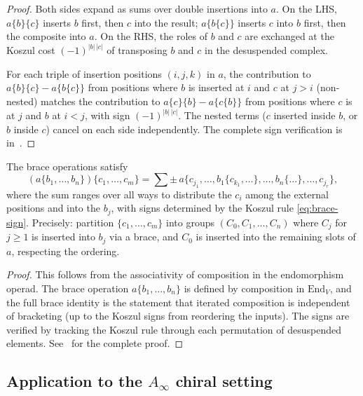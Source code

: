 \begin{proof}
Both sides expand as sums over double insertions into $a$. On the LHS, $a\{b\}\{c\}$ inserts $b$ first, then $c$ into the result; $a\{b\{c\}\}$ inserts $c$ into $b$ first, then the composite into $a$. On the RHS, the roles of $b$ and $c$ are exchanged at the Koszul cost $(-1)^{|b|\,|c|}$ of transposing $b$ and $c$ in the desuspended complex.

For each triple of insertion positions $(i, j, k)$ in $a$, the contribution to $a\{b\}\{c\} - a\{b\{c\}\}$ from positions where $b$ is inserted at $i$ and $c$ at $j > i$ (non-nested) matches the contribution to $a\{c\}\{b\} - a\{c\{b\}\}$ from positions where $c$ is at $j$ and $b$ at $i < j$, with sign $(-1)^{|b|\,|c|}$. The nested terms ($c$ inserted inside $b$, or $b$ inside $c$) cancel on each side independently. The complete sign verification is in~\cite{GJ94}.
\end{proof}

\begin{proposition}
\label{prop:full-brace}
The brace operations satisfy
\[
(a\{b_1, \ldots, b_n\})\{c_1, \ldots, c_m\} = \sum \pm\, a\{c_{j_1}, \ldots, b_1\{c_{k_1}, \ldots\}, \ldots, b_n\{\ldots\}, \ldots, c_{j_r}\},
\]
where the sum ranges over all ways to distribute the $c_i$ among the external positions and into the $b_j$, with signs determined by the Koszul rule \eqref{eq:brace-sign}. Precisely: partition $\{c_1, \ldots, c_m\}$ into groups $(C_0, C_1, \ldots, C_n)$ where $C_j$ for $j \ge 1$ is inserted into $b_j$ via a brace, and $C_0$ is inserted into the remaining slots of $a$, respecting the ordering.
\end{proposition}

\begin{proof}
This follows from the associativity of composition in the endomorphism operad. The brace operation $a\{b_1, \ldots, b_n\}$ is defined by composition in $\mathrm{End}_V$, and the full brace identity is the statement that iterated composition is independent of bracketing (up to the Koszul signs from reordering the inputs). The signs are verified by tracking the Koszul rule through each permutation of desuspended elements. See~\cite{Vor99} for the complete proof.
\end{proof}

\subsection{Application to the $A_\infty$ chiral setting}

